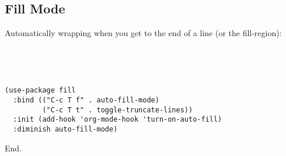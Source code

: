 \documentclass[12pt]{article}
\begin{document}
\subsection{Fill Mode}
\label{sec:org219ec76}
Automatically wrapping when you get to the end of a line (or the fill-region):


\begin{verbatim}




(use-package fill
  :bind (("C-c T f" . auto-fill-mode)
         ("C-c T t" . toggle-truncate-lines))
  :init (add-hook 'org-mode-hook 'turn-on-auto-fill)
  :diminish auto-fill-mode)

\end{verbatim}


End. 
\end{document}
